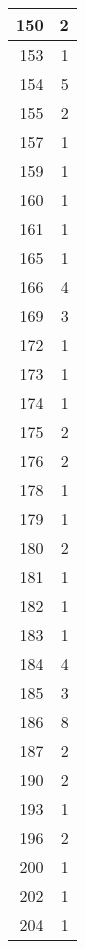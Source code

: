 \begin{tabular}{|r|r|}
\hline
150&2\\
\hline
153&1\\
\hline
154&5\\
\hline
155&2\\
\hline
157&1\\
\hline
159&1\\
\hline
160&1\\
\hline
161&1\\
\hline
165&1\\
\hline
166&4\\
\hline
169&3\\
\hline
172&1\\
\hline
173&1\\
\hline
174&1\\
\hline
175&2\\
\hline
176&2\\
\hline
178&1\\
\hline
179&1\\
\hline
180&2\\
\hline
181&1\\
\hline
182&1\\
\hline
183&1\\
\hline
184&4\\
\hline
185&3\\
\hline
186&8\\
\hline
187&2\\
\hline
190&2\\
\hline
193&1\\
\hline
196&2\\
\hline
200&1\\
\hline
202&1\\
\hline
204&1\\
\hline
\end{tabular}
